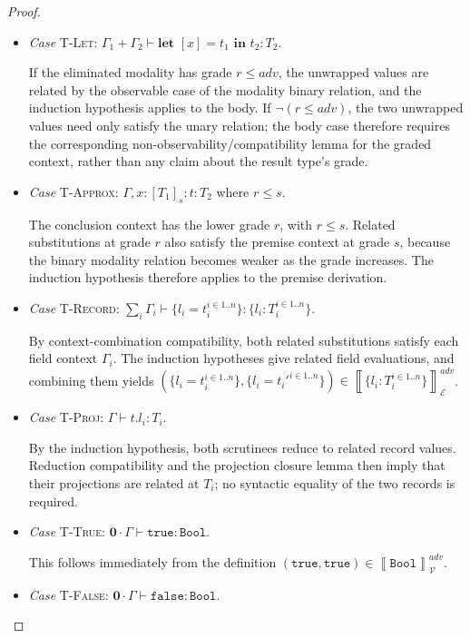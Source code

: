 \documentclass[conference]{IEEEtran}
\newcommand\unp[3]{\textbf{let }[#1]=#2\textbf{ in }#3}
\newcommand\true{\texttt{true}}
\newcommand\false{\texttt{false}}
\newcommand\bool{\texttt{Bool}}
\newcommand\srzero{\textbf{0}}
\newcommand\calv{\mathcal{V}}
\newcommand\cale{\mathcal{E}}
\newcommand\bbrac[1]{\left\llbracket #1\right\rrbracket}
\begin{document}
\begin{proof}
\begin{itemize}
        \item \emph{Case} \textsc{T-Let}: $\Gamma_1+\Gamma_2\vdash\unp{x}{t_1}{t_2}:T_2$.
        
        If the eliminated modality has grade $r\le adv$, the unwrapped values are related by the observable case of the modality binary relation, and the induction hypothesis applies to the body. If $\neg(r\le adv)$, the two unwrapped values need only satisfy the unary relation; the body case therefore requires the corresponding non-observability/compatibility lemma for the graded context, rather than any claim about the result type's grade.
        
        \item \emph{Case} \textsc{T-Approx}: $\Gamma,x:[T_1]_s:t:T_2$ where $r\le s$.
        
        The conclusion context has the lower grade $r$, with $r\le s$. Related substitutions at grade $r$ also satisfy the premise context at grade $s$, because the binary modality relation becomes weaker as the grade increases. The induction hypothesis therefore applies to the premise derivation.
        
        \item \emph{Case} \textsc{T-Record}: $\sum_i\Gamma_i\vdash\{l_i=t_i^{i\in 1..n}\}:\{l_i:T_i^{i\in 1..n}\}$.
        
		By context-combination compatibility, both related substitutions satisfy each field context $\Gamma_i$. The induction hypotheses give related field evaluations, and combining them yields $(\{l_i=t_i^{i\in 1..n}\},\{l_i=t_i'^{i\in 1..n}\})\in\bbrac{\{l_i:T_i^{i\in 1..n}\}}^{adv}_\cale$.
        
        \item \emph{Case} \textsc{T-Proj}: $\Gamma\vdash t.l_i:T_i$.
        
        By the induction hypothesis, both scrutinees reduce to related record values. Reduction compatibility and the projection closure lemma then imply that their projections are related at $T_i$; no syntactic equality of the two records is required.
        
        \item \emph{Case} \textsc{T-True}: $\srzero\cdot\Gamma\vdash\true:\bool$.
        
        This follows immediately from the definition $(\true,\true)\in\bbrac{\bool}^{adv}_\calv$.
        
        \item \emph{Case} \textsc{T-False}: $\srzero\cdot\Gamma\vdash\false:\bool$.
        

\end{itemize}
\end{proof}
\end{document}

